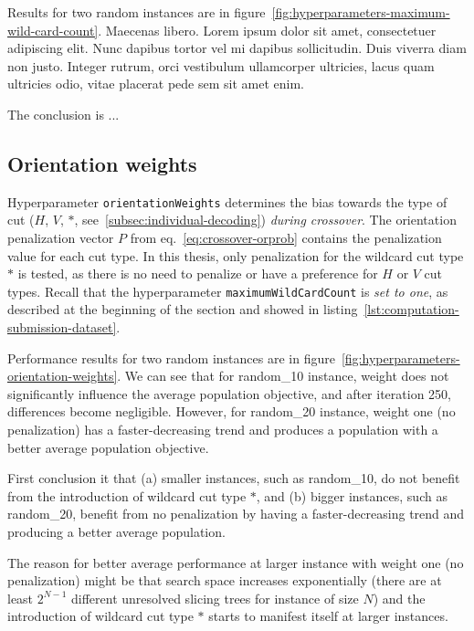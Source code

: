 Results for two random instances are in figure~\ref{fig:hyperparameters-maximum-wild-card-count}.
Maecenas libero. Lorem ipsum dolor sit amet, consectetuer adipiscing elit. Nunc dapibus tortor vel mi dapibus sollicitudin. Duis viverra diam non justo. Integer rutrum, orci vestibulum ullamcorper ultricies, lacus quam ultricies odio, vitae placerat pede sem sit amet enim.

The conclusion is ...

\subsection{Orientation weights}\label{subsec:orientation-weights}
Hyperparameter \verb|orientationWeights| determines the bias towards the type of cut ($H$, $V$, $*$, see~\ref{subsec:individual-decoding}) \textit{during crossover}.
The orientation penalization vector $P$ from eq.~\ref{eq:crossover-orprob} contains the penalization value for each cut type.
In this thesis, only penalization for the wildcard cut type $*$ is tested, as there is no need to penalize or have a preference for $H$ or $V$ cut types.
Recall that the hyperparameter \verb|maximumWildCardCount| is \textit{set to one}, as described at the beginning of the section and showed in listing~\ref{lst:computation-submission-dataset}.

Performance results for two random instances are in figure~\ref{fig:hyperparameters-orientation-weights}.
We can see that for random\_10 instance,
weight does not significantly influence the average population objective, and after iteration 250, differences become negligible.
However, for random\_20 instance,
weight one (no penalization) has a faster-decreasing trend and produces a population with a better average population objective.

First conclusion it that (a) smaller instances, such as random\_10, do not benefit from the introduction of wildcard cut type $*$,
and (b) bigger instances, such as random\_20, benefit from no penalization by having a faster-decreasing trend and producing a better average population.

The reason for better average performance at larger instance with weight one (no penalization) might
be that search space increases exponentially (there are at least $2^{N-1}$ different unresolved slicing trees for instance of size $N$) and the introduction of wildcard cut type $*$ starts to manifest itself
at larger instances.

